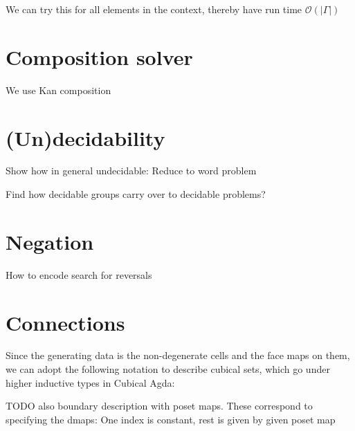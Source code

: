 \documentclass[11pt]{article}
\theoremstyle{definition}
\newcommand{\pint}[1]{\mathbf{1}^{#1}}
\renewcommand{\dim}[1]{\mathsf{dim}({#1})}
\newcommand{\ctxtdim}[1]{|{#1}|}
\begin{document}



We can try this for all elements in the context, thereby have run time
$\mathcal{O}( \ctxtdim{\Gamma} )$

\section{Composition solver}

We use Kan composition


\section{(Un)decidability}

Show how in general undecidable: Reduce to word problem

Find how decidable groups carry over to decidable problems?



\section{Negation}

How to encode search for reversals


\section{Connections}

Since the generating data is the non-degenerate cells and the face maps on them,
we can adopt the following notation to describe cubical sets, which go under
higher inductive types in Cubical Agda:

TODO also boundary description with poset maps. These correspond to specifying
the dmaps: One index is constant, rest is given by given poset map
\end{document}
